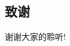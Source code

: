 \documentclass[CJKutf8,compress,hyperref]{beamer}
\begin{document}
\begin{CJK}{UTF8}{song}

  \section{致谢}
  \begin{frame}
          \begin{Huge}
                  \begin{center}
                          谢谢大家的聆听!
                  \end{center}
          \end{Huge}
  \end{frame}
\end{CJK}
\end{document}

